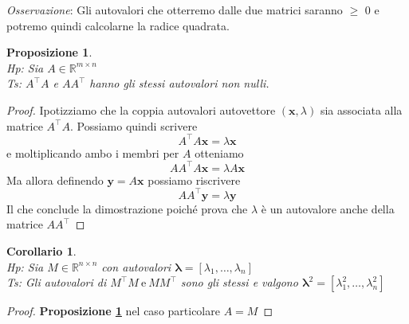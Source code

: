 \documentclass[11pt]{article}
\newtheorem{proposition}{Proposizione}
\newtheorem{corollary}{Corollario}
\newcommand{\R}{\mathbb{R}} %
\begin{document}
\noindent
\textit{Osservazione}: Gli autovalori che otterremo dalle due matrici saranno $\geq$ 0 e potremo quindi calcolarne la radice quadrata.
\begin{proposition}\label{prop 2}
\textbf{}\\
\textit{Hp:} Sia $A \in \R^{m \times n}$\\
\textit{Ts:} $A^\top      A$ e $AA^\top      $ hanno gli stessi autovalori non nulli.
\end{proposition}
\begin{proof}
Ipotizziamo che la coppia autovalori autovettore $(\mathbf{x},\lambda)$ sia associata alla matrice $A^\top      A$. Possiamo quindi scrivere $$A^\top      A\mathbf{x}=\lambda\mathbf{x}$$ e moltiplicando ambo i membri per $A$ otteniamo$$AA^\top      A\mathbf{x}=\lambda A\mathbf{x}$$
Ma allora definendo $\mathbf{y}=A\mathbf{x}$ possiamo riscrivere $$AA^\top      \mathbf{y}=\lambda \mathbf{y}$$
Il che conclude la dimostrazione poiché prova che  $\lambda$ è un autovalore anche della matrice $AA^\top      $
\end{proof}

\begin{corollary}\label{cor 1}
\textbf{}\\
\textit{Hp:} Sia $M \in \R^{n \times n}$ con autovalori $\mathbf{\lambda}=[\lambda_1, \dots, \lambda_n ]$\\
\textit{Ts:} Gli autovalori di $M^\top      M \ \text{e} \ MM^\top      $ sono gli stessi e valgono $\mathbf{\lambda}^2=[\lambda_1^2, \dots, \lambda_n^2 ]$
\end{corollary}
\begin{proof}
\textbf{Proposizione \ref{prop 2}} nel caso particolare $A=M$
\end{proof}
\end{document}
